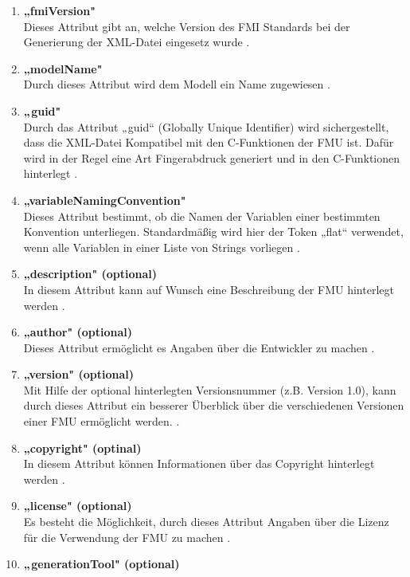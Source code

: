 \begin{enumerate}
	\item \textbf{„fmiVersion"} \cite[S.33]{25} \\
	Dieses Attribut gibt an, welche Version des FMI Standards bei der Generierung der XML-Datei
	eingesetz wurde \cite[S.33]{25}.
	\item \textbf{„modelName"} \cite[S.33]{25} \\
	Durch dieses Attribut wird dem Modell ein Name zugewiesen \cite[S.33]{25}.
	\item \textbf{„guid"} \cite[S.33]{25} \\
	Durch das Attribut „guid“ (Globally Unique Identifier) wird sichergestellt, dass die XML-Datei Kompatibel mit den C-Funktionen der FMU ist. Dafür wird in der Regel eine Art Fingerabdruck generiert und in den C-Funktionen hinterlegt \cite[S.33]{25}.
	\item \textbf{„variableNamingConvention"} \cite[S.33]{25} \\
	Dieses Attribut bestimmt, ob die Namen der Variablen einer bestimmten Konvention 
	unterliegen. Standardmäßig wird hier der Token „flat“ verwendet, wenn alle Variablen
	in einer Liste von Strings vorliegen \cite[S.33]{25}.
	\item \textbf{„description" (optional)} \cite[S.33]{25} \\
	In diesem Attribut kann auf Wunsch eine Beschreibung der FMU hinterlegt werden \cite[S.33]{25}.
	\item \textbf{„author" (optional)} \cite[S.33]{25} \\
	Dieses Attribut ermöglicht es Angaben über die Entwickler zu machen \cite[S.33]{25}.
	\item \textbf{„version" (optional)} \cite[S.33]{25} \\
	Mit Hilfe der optional hinterlegten Versionsnummer (z.B. Version 1.0), kann durch dieses Attribut ein besserer Überblick über die verschiedenen Versionen einer FMU ermöglicht werden. \cite[S.33]{25}.
	\item \textbf{„copyright" (optinal)} \cite[S.33]{25} \\
	In diesem Attribut können Informationen über das Copyright hinterlegt werden \cite[S.33]{25}.
	\item \textbf{„license" (optional)} \cite[S.33]{25} \\
	Es besteht die Möglichkeit, durch dieses Attribut Angaben über die Lizenz für die Verwendung
	der FMU zu machen \cite[S.33]{25}.
	\item \textbf{„generationTool" (optional)} \cite[S.33]{25} \\

\end{enumerate}
